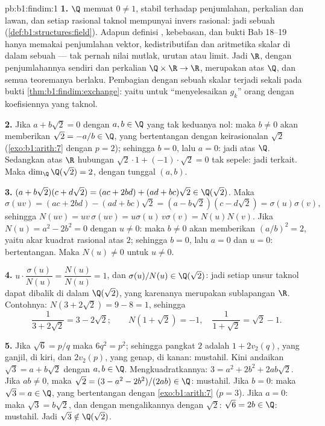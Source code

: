 \begin{solution}{pb:b1:findim:1}
\textbf{1.} $\Q$ memuat $0 \neq 1$, stabil terhadap penjumlahan,
perkalian dan lawan, dan setiap rasional taknol mempunyai
invers rasional: jadi sebuah  (\cref{def:b1:structures:field}). Adapun
definisi , kebebasan,  dan bukti Bab
18--19 hanya memakai penjumlahan vektor, kedistributifan dan
aritmetika skalar di dalam sebuah  --- tak pernah nilai mutlak, urutan atau
limit. Jadi $\R$, dengan penjumlahannya sendiri dan perkalian
$\Q \times \R \to \R$, merupakan  atas $\Q$, dan semua
teoremanya berlaku. Pembagian dengan sebuah skalar terjadi sekali pada bukti
\cref{thm:b1:findim:exchange}: yaitu untuk ``menyelesaikan $g_k$'' orang 
dengan koefisiennya yang taknol.

\textbf{2.} Jika $a + b\sqrt2 = 0$ dengan $a, b \in \Q$ yang tak keduanya
nol: maka $b \neq 0$ akan memberikan $\sqrt2 = -a/b \in \Q$, yang bertentangan dengan
keirasionalan $\sqrt2$ (\cref{exo:b1:arith:7} dengan $p =
2$); sehingga $b = 0$, lalu $a = 0$: jadi  atas $\Q$. Sedangkan atas $\R$
hubungan $\sqrt2\cdot 1 + (-1)\cdot\sqrt2 = 0$ tak sepele:
jadi terkait. Maka $\dim_\Q \Q(\sqrt2) = 2$, dengan  tunggal
$(a, b)$.

\textbf{3.} $(a + b\sqrt2)(c + d\sqrt2) = (ac + 2bd) + (ad +
bc)\sqrt2 \in \Q(\sqrt2)$. Maka
\[
\sigma(uv) = (ac + 2bd) - (ad + bc)\sqrt2
= (a - b\sqrt2)(c - d\sqrt2) = \sigma(u)\sigma(v),
\]
sehingga $N(uv) = uv\,\sigma(uv) = u\sigma(u)\,v\sigma(v) = N(u)N(v)$.
Jika $N(u) = a^2 - 2b^2 = 0$ dengan $u \neq 0$: maka $b \neq 0$ akan memberikan
$(a/b)^2 = 2$, yaitu akar kuadrat rasional atas $2$; sehingga $b = 0$, lalu $a
= 0$ dan $u = 0$: bertentangan. Maka $N(u) \neq 0$ untuk $u \neq
0$.

\textbf{4.} $u \cdot \dfrac{\sigma(u)}{N(u)} = \dfrac{N(u)}{N(u)}
= 1$, dan $\sigma(u)/N(u) \in \Q(\sqrt2)$: jadi setiap unsur taknol
dapat dibalik di dalam $\Q(\sqrt2)$, yang karenanya merupakan sublapangan
$\R$. Contohnya: $N(3 + 2\sqrt2) = 9 - 8 = 1$, sehingga
\[
\frac1{3 + 2\sqrt2} = 3 - 2\sqrt2 ;
\qquad
N(1 + \sqrt2) = -1, \quad
\frac1{1 + \sqrt2} = \sqrt2 - 1 .
\]

\textbf{5.} Jika $\sqrt6 = p/q$ maka $6q^2 = p^2$; sehingga pangkat
$2$ adalah $1 + 2v_2(q)$, yang ganjil, di kiri, dan $2v_2(p)$, yang genap, di
kanan: mustahil. Kini andaikan $\sqrt3 = a + b\sqrt2$ dengan
$a, b \in \Q$. Mengkuadratkannya: $3 = a^2 + 2b^2 + 2ab\sqrt2$. Jika $ab
\neq 0$, maka $\sqrt2 = (3 - a^2 - 2b^2)/(2ab) \in \Q$:
mustahil. Jika $b = 0$: maka $\sqrt3 = a \in \Q$, yang bertentangan dengan
\cref{exo:b1:arith:7} ($p = 3$). Jika $a = 0$: maka $\sqrt3 = b\sqrt2$,
dan dengan mengalikannya dengan $\sqrt2$: $\sqrt6 = 2b \in \Q$: mustahil.
Jadi $\sqrt3 \notin \Q(\sqrt2)$.


\end{solution}
